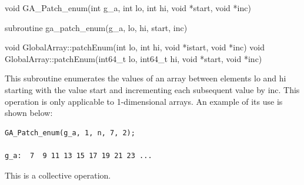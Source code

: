 \documentclass[12pt]{article}
\begin{document}

\begin{capi}
\begin{ccode}
void GA_Patch_enum(int g_a, int lo, int hi, void *start, void *inc)
\end{ccode}
\begin{funcargs}
\end{funcargs}
\end{capi}

\begin{fapi}
\begin{fcode}
subroutine ga_patch_enum(g_a, lo, hi, start, inc)
\end{fcode}
\begin{funcargs}
\end{funcargs}
\end{fapi}

\begin{cxxapi}
\begin{cxxcode}
void GlobalArray::patchEnum(int lo, int hi, void *istart, void *inc)
void GlobalArray::patchEnum(int64_t lo, int64_t hi, void *start, void *inc)
\end{cxxcode}
\begin{funcargs}
\end{funcargs}
\end{cxxapi}
\gcoll
\begin{desc}

This subroutine enumerates the values of an array between elements lo and hi starting with the value start and incrementing each subsequent value by inc. This operation is only applicable to 1-dimensional arrays. An example of its use is shown below:

\begin{verbatim}
GA_Patch_enum(g_a, 1, n, 7, 2);

g_a:  7  9 11 13 15 17 19 21 23 ...
\end{verbatim}

This is a collective operation.
\end{desc}
\end{document}
